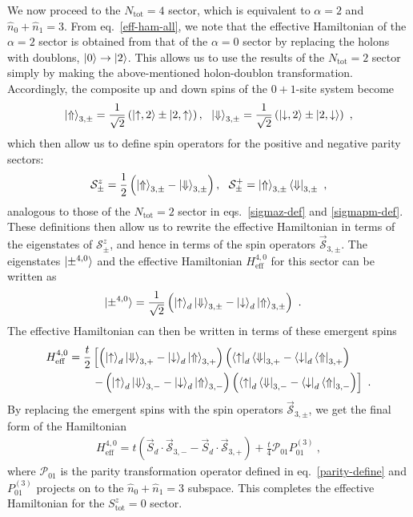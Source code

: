 \documentclass{iopart}
\begin{document}
We now proceed to the \(N_\text{tot}=4\) sector, which is equivalent to \(\alpha=2\) and \(\hat n_0 + \hat n_1 = 3\). From eq.~\eqref{eff-ham-all}, we note that the effective Hamiltonian of the \(\alpha=2\) sector is obtained from that of the \(\alpha=0\) sector by replacing the holons with doublons, \(\ket{0} \to \ket{2}\). This allows us to use the results of the \(N_\text{tot}=2\) sector simply by making the above-mentioned holon-doublon transformation. Accordingly, the composite up and down spins of the \(0+1\)-site system become
\begin{eqnarray}
	\ket{\Uparrow}_{3,\pm} = \frac{1}{\sqrt 2}\left(\ket{\uparrow,2} \pm \ket{2, \uparrow}\right), ~ ~\ket{\Downarrow}_{3,\pm} = \frac{1}{\sqrt 2}\left( \ket{\downarrow, 2} \pm \ket{2, \downarrow}\right)~,
\end{eqnarray}
which then allow us to define spin operators for the positive and negative parity sectors:
\begin{eqnarray}
	\mathcal{S}^z_\pm = \frac{1}{2}\left(\ket{\Uparrow}_{3,\pm} - \ket{\Downarrow}_{3,\pm}\right), ~~\mathcal{S}^+_\pm = \ket{\Uparrow}_{3,\pm}\bra{\Downarrow}_{3,\pm}~,
\end{eqnarray}
analogous to those of the \(N_\text{tot}=2\) sector in eqs.~\eqref{sigmaz-def} and \eqref{sigmapm-def}. These definitions then allow us to rewrite the effective Hamiltonian in terms of the eigenstates of \(\mathcal{S}^z_\pm\), and hence in terms of the spin operators \(\vec{\mathcal{S}}_{3,\pm}\). The eigenstates \(\ket{\pm^{4,0}}\) and the effective Hamiltonian \(H_\text{eff}^{4,0}\) for this sector can be written as
\begin{eqnarray}
	\ket{\pm^{4,0}} &= \frac{1}{\sqrt 2}\left( \ket{\uparrow}_d\ket{\Downarrow}_{3,\pm} -  \ket{\downarrow}_d\ket{\Uparrow}_{3,\pm}\right)~.
\end{eqnarray}
The effective Hamiltonian can then be written in terms of these emergent spins
\begin{eqnarray}
	H_\text{eff}^{4,0} = \frac{t}{2}&\left[\left( \ket{\uparrow}_d\ket{\Downarrow}_{3,+} -  \ket{\downarrow}_d\ket{\Uparrow}_{3,+}\right)\left( \bra{\uparrow}_d\bra{\Downarrow}_{3,+} -  \bra{\downarrow}_d\bra{\Uparrow}_{3,+}\right)\right.\nonumber \\
					&\left.- \left(\ket{\uparrow}_d\ket{\Downarrow}_{3,-} -  \ket{\downarrow}_d\ket{\Uparrow}_{3,-}\right)\left( \bra{\uparrow}_d\bra{\Downarrow}_{3,-} -  \bra{\downarrow}_d\bra{\Uparrow}_{3,-}\right)\right] ~.
\end{eqnarray}
By replacing the emergent spins with the spin operators \(\vec{\mathcal{S}}_{3,\pm}\), we get the final form of the Hamiltonian
\begin{eqnarray}
	H_\text{eff}^{4,0} = t\left( \vec{S}_d\cdot\vec{\mathcal{S}}_{3,-} - \vec{S}_d\cdot\vec{\mathcal{S}}_{3,+}\right) + \frac{t}{4}\mathcal{P}_{01}P_{01}^{(3)}~,
\end{eqnarray}
where \(\mathcal{P}_{01}\) is the parity transformation operator defined in eq.~\eqref{parity-define} and \(P_{01}^{(3)}\) projects on to the \(\hat n_0 + \hat n_1 = 3\) subspace. This completes the effective Hamiltonian for the \(S^z_\text{tot}=0\) sector.
\end{document}

